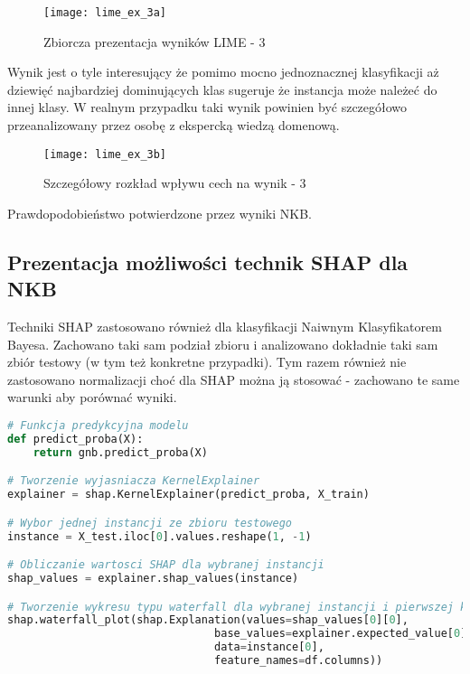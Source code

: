 \begin{figure}[H]
    \centering
    \texttt{[image: lime\_ex\_3a]}
    \caption{Zbiorcza prezentacja wyników LIME - 3}
    \label{fig:lime_ex_3a}
\end{figure}

Wynik jest o tyle interesujący że pomimo mocno jednoznacznej klasyfikacji aż dziewięć najbardziej dominujących klas sugeruje że instancja może należeć do innej klasy. W realnym przypadku taki wynik powinien być szczegółowo przeanalizowany przez osobę z ekspercką wiedzą domenową.\\

\begin{figure}[H]
    \centering
    \texttt{[image: lime\_ex\_3b]}
    \caption{Szczegółowy rozkład wpływu cech na wynik - 3}
    \label{fig:lime_ex_3b}
\end{figure}

Prawdopodobieństwo potwierdzone przez wyniki NKB.\\

\subsection{Prezentacja możliwości technik SHAP dla NKB}
Techniki SHAP zastosowano również dla klasyfikacji Naiwnym Klasyfikatorem Bayesa. Zachowano taki sam podział zbioru i analizowano dokładnie taki sam zbiór testowy (w tym też konkretne przypadki). Tym razem również nie zastosowano normalizacji choć dla SHAP można ją stosować - zachowano te same warunki aby porównać wyniki.\\

\begin{lstlisting}[language=Python, caption=Definicja explainera dla SHAP]
# Funkcja predykcyjna modelu
def predict_proba(X):
    return gnb.predict_proba(X)

# Tworzenie wyjasniacza KernelExplainer
explainer = shap.KernelExplainer(predict_proba, X_train)

# Wybor jednej instancji ze zbioru testowego
instance = X_test.iloc[0].values.reshape(1, -1)

# Obliczanie wartosci SHAP dla wybranej instancji
shap_values = explainer.shap_values(instance)

# Tworzenie wykresu typu waterfall dla wybranej instancji i pierwszej klasy
shap.waterfall_plot(shap.Explanation(values=shap_values[0][0], 
                                base_values=explainer.expected_value[0], 
                                data=instance[0], 
                                feature_names=df.columns))
\end{lstlisting}

